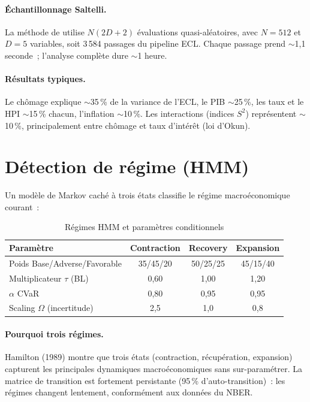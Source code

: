 \documentclass[12pt, a4paper, twoside, openright]{report}
\theoremstyle{definition}
\begin{document}
\paragraph{Échantillonnage Saltelli.} La méthode de \citet{saltelli2002} utilise $N(2D+2)$ évaluations quasi-aléatoires, avec $N = 512$ et $D = 5$ variables, soit 3\,584 passages du pipeline ECL. Chaque passage prend $\sim$1{,}1 seconde~; l'analyse complète dure $\sim$1 heure.

\paragraph{Résultats typiques.} Le chômage explique $\sim$35\,\% de la variance de l'ECL, le PIB $\sim$25\,\%, les taux et le HPI $\sim$15\,\% chacun, l'inflation $\sim$10\,\%. Les interactions (indices $S^2$) représentent $\sim$10\,\%, principalement entre chômage et taux d'intérêt (loi d'Okun).

\section{Détection de régime (HMM)}
\label{sec:gouv:hmm}

Un modèle de Markov caché à trois états classifie le régime macroéconomique courant~:

\begin{table}[htbp]
\centering
\caption{Régimes HMM et paramètres conditionnels}
\label{tab:hmm-regimes}
\begin{tabular}{lccc}
\toprule
Paramètre & Contraction & Recovery & Expansion \\
\midrule
Poids Base/Adverse/Favorable & 35/45/20 & 50/25/25 & 45/15/40 \\
Multiplicateur $\tau$ (BL) & 0{,}60 & 1{,}00 & 1{,}20 \\
$\alpha$ CVaR & 0{,}80 & 0{,}95 & 0{,}95 \\
Scaling $\Omega$ (incertitude) & 2{,}5 & 1{,}0 & 0{,}8 \\
\bottomrule
\end{tabular}
\end{table}

\paragraph{Pourquoi trois régimes.} Hamilton (1989) montre que trois états (contraction, récupération, expansion) capturent les principales dynamiques macroéconomiques sans sur-paramétrer. La matrice de transition est fortement persistante (95\,\% d'auto-transition)~: les régimes changent lentement, conformément aux données du NBER.
\end{document}
